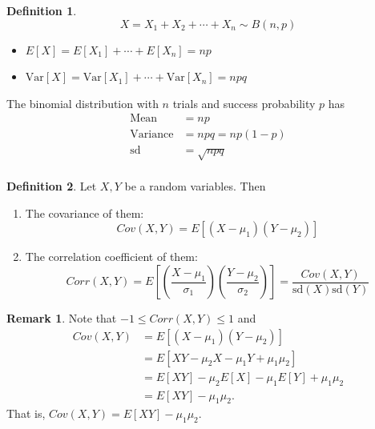 \documentclass[12pt,openany]{book}
\theoremstyle{definition}
\newtheorem{definition}{Definition}[chapter]
\newtheorem{remark}{Remark}[chapter]
\newcommand{\dispsty}{\displaystyle}
\newcommand{\Var}{\text{Var}}
\newcommand{\sd}{\text{sd}}
\newcommand{\Cov}{\textit{Cov}}
\newcommand{\Corr}{\textit{Corr}}
\begin{document}
	\begin{tcolorbox}[colback=white,colframe=defcolor,arc=5pt,title={\color{white}\bf Mean and Standard Deviation of the Binomial Distribution}]
		\begin{definition}
			\[
			X=X_1+X_2+\cdots+X_n\sim B(n,p)
			\] \begin{itemize}
				\item \(E[X]=E[X_1] + \cdots + E[X_n] = np \)
				\item \(\Var[X]=\Var[X_1] + \cdots + \Var[X_n] = npq \)
			\end{itemize} The binomial distribution with $n$ trials and success probability $p$ has \begin{align*}
			\text{Mean} &= np \\
			\text{Variance} &= npq = np(1-p) \\
			\text{sd} &= \sqrt{npq} \\
		\end{align*}
		\end{definition}
	\end{tcolorbox}
	\vspace{10pt}
	\begin{tcolorbox}[colback=white,colframe=defcolor,arc=5pt,title={\color{white}\bf Covariance and Correlation Coefficient of Two Random Variables}]
		\begin{definition}
			Let $X, Y$ be a random variables. Then \begin{enumerate}
				\item The covariance of them: \[\Cov(X,Y)=E[(X-\mu_1)(Y-\mu_2)] \]
				\item The correlation coefficient of them: \[\dispsty\Corr(X,Y)=E\left[\left(\frac{X-\mu_1}{\sigma_1}\right)\left(\frac{Y-\mu_2}{\sigma_2}\right)\right]=\frac{\Cov(X,Y)}{\sd(X)\sd(Y)} \]
			\end{enumerate}
		\end{definition}
	\end{tcolorbox}
	\begin{remark}
		Note that $-1\leq\Corr(X,Y)\leq 1$ and \begin{align*}
			\Cov(X,Y) &= E[(X-\mu_1)(Y-\mu_2) ] \\
			&= E[XY-\mu_2X-\mu_1Y+\mu_1\mu_2] \\
			&= E[XY] - \mu_2E[X] -\mu_1E[Y] +\mu_1\mu_2 \\
			&= E[XY] - \mu_1\mu_2.
		\end{align*} That is, $\Cov(X,Y)=E[XY]-\mu_1\mu_2$.
	\end{remark}
\end{document}
